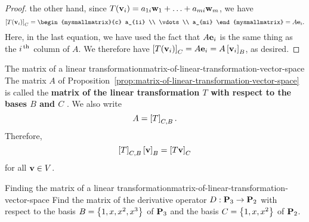 \begin{proof}
  the other hand, since
  $T(\vect{v}_i) = a_{1i}\vect{w}_1 + \ldots + a_{mi}\vect{w}_m$,
  we have
  \begin{equation*}
    \coord{T(\vect{v}_i)}_C =
    \begin{mysmallmatrix}{c}
      a_{1i} \\ \vdots \\ a_{mi}
    \end{mysmallmatrix}
    = A\vect{e}_i.
  \end{equation*}
  Here, in the last equation, we have used the fact that $A\vect{e}_i$
  is the same thing as the $i^{\,\rm th}$ column of $A$. We therefore have
  $\coord{T(\vect{v}_i)}_C = A\vect{e}_i = A \coord{\vect{v}_i}_B$, as
  desired.
\end{proof}

\begin{definition}{The matrix of a linear transformation}{matrix-of-linear-transformation-vector-space}
  The matrix $A$ of
  Proposition~\ref{prop:matrix-of-linear-transformation-vector-space} is called the
  \textbf{matrix of the linear transformation\/ $T$ with respect to
    the bases $B$ and $C$}%
  .  We also
  write
  \begin{equation*}
    A = \left[T\right]_{C,B}.
  \end{equation*}
  Therefore,
  \begin{equation*}
    \coord{T}_{C,B}\coord{\vect{v}}_B = \coord{T\vect{v}}_C
  \end{equation*}
  for all $\vect{v}\in V$.
\end{definition}

\begin{example}{Finding the matrix of a linear transformation}{matrix-of-linear-transformation-vector-space}
  Find the matrix of the derivative operator $D:\mathbf{P}_3\to\mathbf{P}_2$
  with respect to the basis $B=\left\{1,x,x^2,x^3\right\}$ of $\mathbf{P}_3$ and the
  basis $C=\left\{1,x,x^2\right\}$ of $\mathbf{P}_2$.
\end{example}

